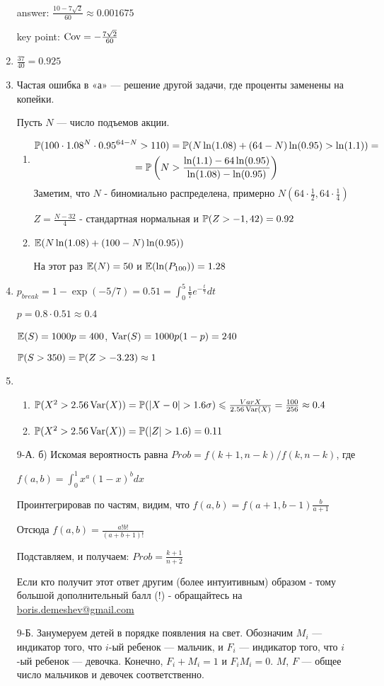 \begin{enumerate}
answer: $\frac{10-7\sqrt{2}}{60}\approx 0.001675$

key point: $\Cov=-\frac{7\sqrt{2}}{60}$
\item $\frac{37}{40}=0.925$
\item Частая ошибка в «а» — решение другой задачи, где проценты заменены на копейки.

Пусть $N$ — число подъемов акции.
\begin{enumerate}
\item
\begin{multline*}
\P(100\cdot 1.08^N\cdot 0.95^{64-N}>110)= \P(N \ln(1.08)+(64-N) \ln(0.95)> \ln(1.1))= \\
= \P\left(N>\frac{\ln(1.1)-64\ln(0.95)}{\ln(1.08)-\ln(0.95)}\right)
\end{multline*}
Заметим, что $N$ - биномиально распределена, примерно $N\left(64\cdot\frac{1}{2},64\cdot\frac{1}{4}\right)$

$Z=\frac{N-32}{4}$ - стандартная нормальная и $\P(Z>-1,42)=0.92$
\item $\E(N\ln(1.08)+(100-N)\ln(0.95))$

На этот раз $\E(N)=50$ и $\E(\ln(P_{100}))=1.28$
\end{enumerate}
\item $p_{break}=1-\exp(-5/7)=0.51=\int_{0}^{5}\frac{1}{7}e^{-\frac{t}{7}}dt$

$p=0.8\cdot 0.51\approx 0.4$

$\E(S)=1000p=400$, $\Var(S)=1000p(1-p)=240$

$\P(S>350)=\P(Z>-3.23)\approx 1$
\item
\begin{enumerate}
\item $\P(X^{2}>2.56\Var(X))=\P(|X-0|>1.6\sigma)\le
\frac{Var{X}}{2.56\Var(X)}=\frac{100}{256}\approx 0.4$
\item $\P(X^{2}>2.56\Var(X))=\P(|Z|>1.6)=0.11$
\end{enumerate}
\item[9-А.] б) Искомая вероятность равна $Prob=f(k+1,n-k)/f(k,n-k)$, где

$f(a,b)=\int_{0}^{1}x^{a}(1-x)^{b}dx$

Проинтегрировав по частям, видим, что $f(a,b)=f(a+1,b-1)\frac{b}{a+1}$

Отсюда $f(a,b)=\frac{a!b!}{(a+b+1)!}$

Подставляем, и получаем: $Prob=\frac{k+1}{n+2}$

Если кто получит этот ответ другим (более интуитивным) образом - тому большой дополнительный балл (!) - обращайтесь на \href{mailto:boris.demeshev@gmail.com}{boris.demeshev@gmail.com}
\item[9-Б.] Занумеруем детей в порядке появления на свет. Обозначим $M_{i}$ — индикатор того, что $i$-ый ребенок — мальчик, и $F_{i}$ — индикатор того, что $i$-ый ребенок — девочка. Конечно, $F_{i}+M_{i}=1$ и $F_{i}M_{i}=0$.
$M$, $F$ — общее число мальчиков и девочек соответственно.


\end{enumerate}
